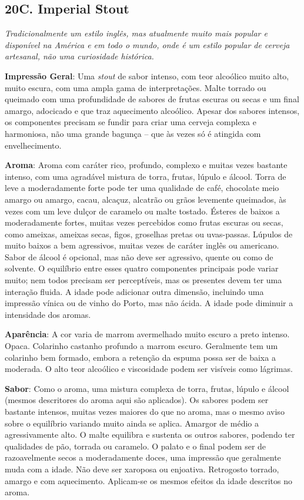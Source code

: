 \subsection*{20C. Imperial Stout}
\textit{Tradicionalmente um estilo inglês, mas atualmente muito mais popular e disponível na América e em todo o mundo, onde é um estilo popular de cerveja artesanal, não uma curiosidade histórica.}

\textbf{Impressão Geral}: Uma \textit{stout} de sabor intenso, com teor alcoólico muito alto, muito escura, com uma ampla gama de interpretações. Malte torrado ou queimado com uma profundidade de sabores de frutas escuras ou secas e um final amargo, adocicado e que traz aquecimento alcoólico. Apesar dos sabores intensos, os componentes precisam se fundir para criar uma cerveja complexa e harmoniosa, não uma grande bagunça – que às vezes só é atingida com envelhecimento.

\textbf{Aroma}: Aroma com caráter rico, profundo, complexo e muitas vezes bastante intenso, com uma agradável mistura de torra, frutas, lúpulo e álcool. Torra de leve a moderadamente forte pode ter uma qualidade de café, chocolate meio amargo ou amargo, cacau, alcaçuz, alcatrão ou grãos levemente queimados, às vezes com um leve dulçor de caramelo ou malte tostado. Ésteres de baixos a moderadamente fortes, muitas vezes percebidos como frutas escuras ou secas, como ameixas, ameixas secas, figos, groselhas pretas ou uvas-passas. Lúpulos de muito baixos a bem agressivos, muitas vezes de caráter inglês ou americano. Sabor de álcool é opcional, mas não deve ser agressivo, quente ou como de solvente. O equilíbrio entre esses quatro componentes principais pode variar muito; nem todos precisam ser perceptíveis, mas os presentes devem ter uma interação fluida. A idade pode adicionar outra dimensão, incluindo uma impressão vínica ou de vinho do Porto, mas não ácida. A idade pode diminuir a intensidade dos aromas.

\textbf{Aparência}: A cor varia de marrom avermelhado muito escuro a preto intenso. Opaca. Colarinho castanho profundo a marrom escuro. Geralmente tem um colarinho bem formado, embora a retenção da espuma possa ser de baixa a moderada. O alto teor alcoólico e viscosidade podem ser visíveis como lágrimas.

\textbf{Sabor}: Como o aroma, uma mistura complexa de torra, frutas, lúpulo e álcool (mesmos descritores do aroma aqui são aplicados). Os sabores podem ser bastante intensos, muitas vezes maiores do que no aroma, mas o mesmo aviso sobre o equilíbrio variando muito ainda se aplica. Amargor de médio a agressivamente alto. O malte equilibra e sustenta os outros sabores, podendo ter qualidades de pão, torrada ou caramelo. O palato e o final podem ser de razoavelmente secos a moderadamente doces, uma impressão que geralmente muda com a idade. Não deve ser xaroposa ou enjoativa. Retrogosto torrado, amargo e com aquecimento. Aplicam-se os mesmos efeitos da idade descritos no aroma.

